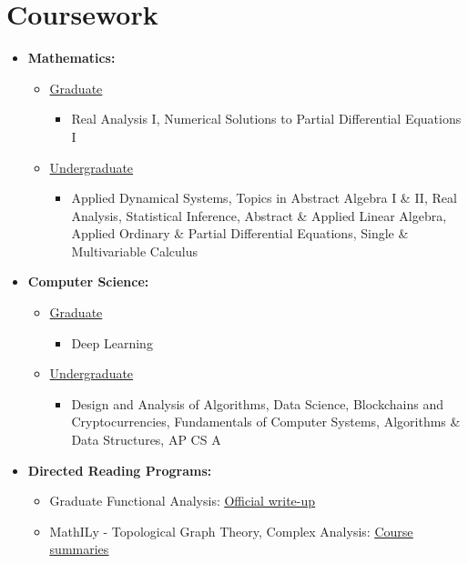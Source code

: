 \documentclass{mycv}
\begin{document}
\maketitle%

\section{Coursework}

\begin{itemize}[label={}]
    \item \textbf{Mathematics:} 
    \begin{itemize}
      \item \underline{Graduate}
        \begin{itemize}
          \item Real Analysis I, Numerical Solutions to Partial Differential Equations I 
        \end{itemize}
      \item \underline{Undergraduate}
        \begin{itemize}
          \item Applied Dynamical Systems, Topics in Abstract Algebra I \& II, Real Analysis, Statistical Inference, Abstract \& Applied Linear Algebra, Applied Ordinary \& Partial Differential Equations, Single \& Multivariable Calculus
        \end{itemize}
    \end{itemize}
    \item \textbf{Computer Science:}
    \begin{itemize}
    \item \underline{Graduate}
        \begin{itemize}
          \item Deep Learning 
        \end{itemize}
      \item \underline{Undergraduate}
        \begin{itemize}
          \item  Design and Analysis of Algorithms, Data Science, Blockchains and Cryptocurrencies, Fundamentals of Computer Systems, Algorithms \& Data Structures, AP CS A 
        \end{itemize}
      \end{itemize}
    \item \textbf{Directed Reading Programs:} 
      \begin{itemize} 
        \item Graduate Functional Analysis: \href{https://github.com/alizma/Spring2021_Functional_Analysis_Paper}{\underline{Official write-up}} 
        \item MathILy - Topological Graph Theory, Complex Analysis: \href{http://www.mathily.org/facts.html}{\underline{Course summaries}}
      \end{itemize}
\end{itemize}
\end{document}
